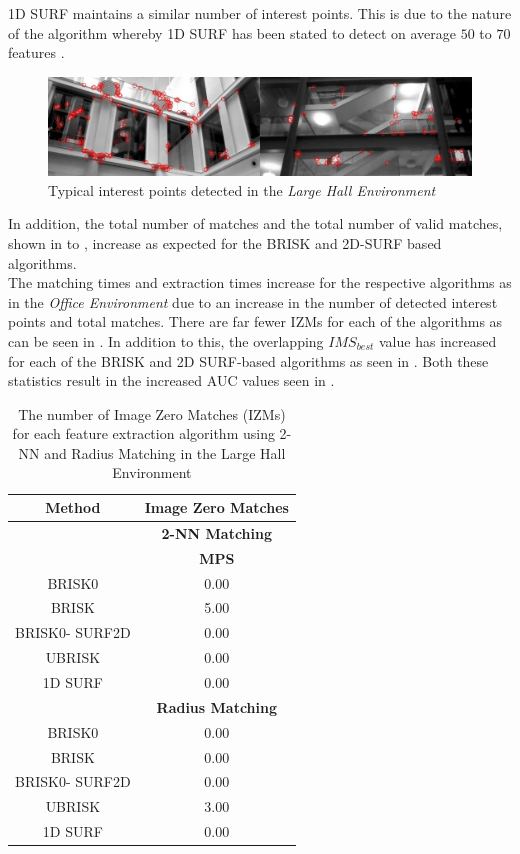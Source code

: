 1D SURF maintains a similar number of interest points. This is due to the nature of the algorithm whereby 1D SURF has been stated to detect on average $50$ to $70$ features \citep{Anderson}.\\


\begin{figure}
  \centering
    \includegraphics[width=1.0\textwidth]{../Drawings/Matching/dataset3_interestPoints.jpg}
    \caption{Typical interest points detected in the \textit{Large Hall Environment}} 
    \label{fig:lh_ip}
\end{figure}


In addition, the total number of matches and the total number of valid matches, shown in  to , increase as expected for the BRISK and 2D-SURF based algorithms.\\

The matching times and extraction times increase for the respective algorithms as in the \textit{Office Environment} due to an increase in the number of detected interest points and total matches. There are far fewer IZMs for each of the algorithms as can be seen in . In addition to this, the overlapping $IMS_{best}$ value has increased for each of the BRISK and 2D SURF-based algorithms as seen in . Both these statistics result in the increased AUC values seen in . \\



\begin{table}
\centering
\caption{The number of Image Zero Matches (IZMs) for each feature extraction
algorithm using 2-NN and Radius Matching in the Large Hall Environment}


\begin{tabular}{|c|c|}
\hline 
\textbf{Method} & \multicolumn{1}{c|}{\textbf{Image Zero Matches}}\tabularnewline
\hline 
 & \multicolumn{1}{c|}{\textbf{2-NN Matching}}\tabularnewline
\hline 
 & \textbf{MPS}\tabularnewline
\hline 
\hline 
BRISK0 & 0.00\tabularnewline
\hline 
BRISK & 5.00\tabularnewline
\hline 
BRISK0- SURF2D & 0.00\tabularnewline
\hline 
UBRISK & 0.00\tabularnewline
\hline 
1D SURF & 0.00\tabularnewline
\hline 
 & \multicolumn{1}{c|}{\textbf{Radius Matching}}\tabularnewline
\hline 
BRISK0 & 0.00\tabularnewline
\hline 
BRISK & 0.00\tabularnewline
\hline 
BRISK0- SURF2D & 0.00\tabularnewline
\hline 
UBRISK & 3.00\tabularnewline
\hline 
1D SURF & 0.00\tabularnewline
\hline 
\end{tabular}
\label{tab:lh_izm}
\end{table}

